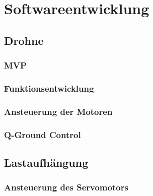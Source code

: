 \chapter{Softwareentwicklung}

\section{Drohne}
\subsection{MVP}
\subsection{Funktionsentwicklung}
\subsection{Ansteuerung der Motoren}
\subsection{Q-Ground Control}

\section{Lastaufhängung}
\subsection{Ansteuerung des Servomotors}

